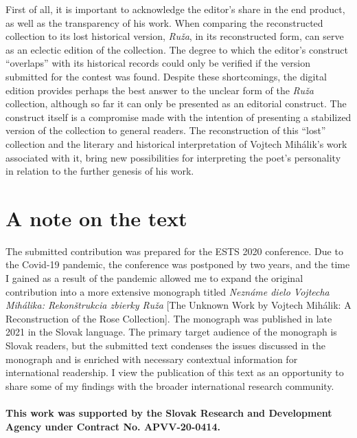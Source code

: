 \begin{paper}
First of all, it is important to acknowledge the editor's share in the
end product, as well as the transparency of his work. When comparing the
reconstructed collection to its lost historical version, \emph{Ruža}, in
its reconstructed form, can serve as an eclectic edition of the
collection. The degree to which the editor's construct ``overlaps'' with
its historical records could only be verified if the version submitted
for the contest was found. Despite these shortcomings, the digital
edition provides perhaps the best answer to the unclear form of the
\emph{Ruža} collection, although so far it can only be presented as an
editorial construct. The construct itself is a compromise made with the
intention of presenting a stabilized version of the collection to
general readers. The reconstruction of this ``lost'' collection and the
literary and historical interpretation of Vojtech Mihálik's work
associated with it, bring new possibilities for interpreting the poet's
personality in relation to the further genesis of his work.

\section*{A note on the text}

The submitted contribution was prepared for the ESTS 2020 conference.
Due to the Covid-19 pandemic, the conference was postponed by two years,
and the time I gained as a result of the pandemic allowed me to expand
the original contribution into a more extensive monograph titled
\emph{Neznáme dielo Vojtecha Mihálika: Rekonštrukcia zbierky Ruža} [The Unknown Work by Vojtech Mihálik: A Reconstruction of the Rose Collection]. The
monograph was published in late 2021 in the Slovak language. The primary
target audience of the monograph is Slovak readers, but the submitted
text condenses the issues discussed in the monograph and is enriched
with necessary contextual information for international readership. I
view the publication of this text as an opportunity to share some of my
findings with the broader international research community.
\\ \\
\textbf{This work was supported by the Slovak Research and Development
Agency under Contract No. APVV-20-0414.}
\\ \\


\begin{flushleft}
    \renewcommand*{\mkbibnamefamily}[1]{\textsc{#1}}
    \renewcommand*{\mkbibnamegiven}[1]{\textsc{#1}} 
\printbibliography
\end{flushleft}

\end{paper}
